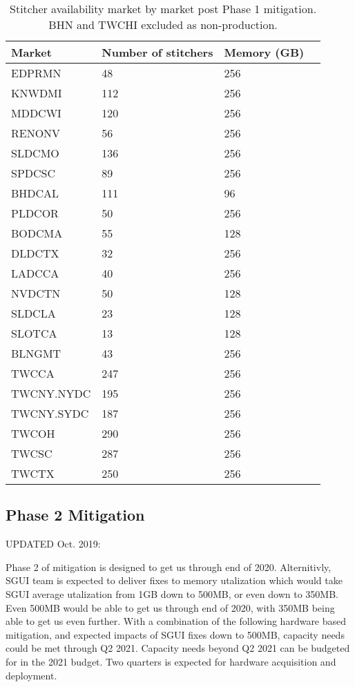 \documentclass{article}
\begin{document}
\begin{table}
\begin{tabular}{|l|l|l|l|} 
\hline Market & Number of stitchers & Memory (GB)\\
\hline EDPRMN & 48 & 256\\
\hline KNWDMI & 112 & 256\\
\hline MDDCWI & 120 & 256\\
\hline RENONV & 56 & 256\\
\hline SLDCMO & 136 & 256\\
\hline SPDCSC & 89 & 256\\
\hline BHDCAL & 111 & 96\\
\hline PLDCOR & 50 & 256\\
\hline BODCMA & 55 & 128\\
\hline DLDCTX & 32 & 256\\
\hline LADCCA & 40 & 256\\
\hline NVDCTN & 50 & 128\\
\hline SLDCLA & 23 & 128\\
\hline SLOTCA & 13 & 128\\
\hline BLNGMT & 43 & 256\\
\hline TWCCA & 247 & 256\\
\hline TWCNY.NYDC & 195 & 256\\
\hline TWCNY.SYDC & 187 & 256\\
\hline TWCOH & 290 & 256\\
\hline TWCSC & 287 & 256\\
\hline TWCTX & 250 & 256\\
\hline 
\end{tabular}
\caption{\label{TABLE-marketStitcherAvailUpdated}Stitcher availability market by market post Phase 1 mitigation. BHN and TWCHI excluded as non-production.} 
\end{table}

\subsection{Phase 2 Mitigation}
\label{SECTION-Phase2}

UPDATED Oct. 2019:

Phase 2 of mitigation is designed to get us through end of 2020. Alternitivly, SGUI team is expected to deliver fixes to memory utalization which would take SGUI average utalization from 1GB down to 500MB, or even down to 350MB. Even 500MB  would be able to get us through end of 2020, with 350MB being able to get us even further. With a combination of the following hardware based mitigation, and expected impacts of SGUI fixes down to 500MB, capacity needs could be met through Q2 2021. Capacity needs beyond Q2 2021 can be budgeted for in the 2021 budget. Two quarters is expected for hardware acquisition and deployment. 
\end{document}
